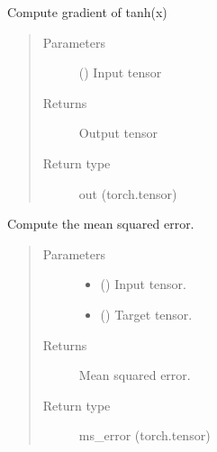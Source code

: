\documentclass[letterpaper,10pt,english,openany,oneside]{sphinxmanual}
\begin{document}

\begin{fulllineitems}
\label{\detokenize{nn:nn.functional.d_tanh}}
Compute gradient of tanh(x)
\begin{quote}\begin{description}
\item[{Parameters}] \leavevmode
{} () \textendash{} Input tensor

\item[{Returns}] \leavevmode
Output tensor

\item[{Return type}] \leavevmode
out (torch.tensor)

\end{description}\end{quote}

\end{fulllineitems}


\begin{fulllineitems}
\label{\detokenize{nn:nn.functional.mse}}
Compute the mean squared error.
\begin{quote}\begin{description}
\item[{Parameters}] \leavevmode\begin{itemize}
\item {} 
 () \textendash{} Input tensor.

\item {} 
 () \textendash{} Target tensor.

\end{itemize}

\item[{Returns}] \leavevmode
Mean squared error.

\item[{Return type}] \leavevmode
ms\_error (torch.tensor)

\end{description}\end{quote}

\end{fulllineitems}
\end{document}

